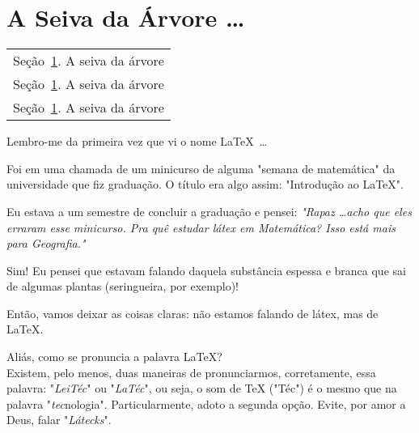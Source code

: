 \section{A Seiva da Árvore \ldots}\label{sec:seiva} %

\begin{margintable}\vspace{.8in}\footnotesize
  \begin{tabularx}{\marginparwidth}{|X}
    Seção~\ref{sec:seiva}. A seiva da árvore\\
    Seção~\ref{sec:seiva}. A seiva da árvore\\
    Seção~\ref{sec:seiva}. A seiva da árvore\\
  \end{tabularx}
\end{margintable}

Lembro-me da primeira vez que vi o nome \LaTeX\ \ldots

Foi em uma chamada de um minicurso de alguma "semana de matemática" da 
universidade que fiz graduação.
O título era algo assim: "Introdução ao \LaTeX".

Eu estava a um semestre de concluir a graduação e pensei: 
\textit{
  "Rapaz \ldots acho que eles erraram esse minicurso. 
  Pra quê estudar látex em Matemática? 
  Isso está mais para Geografia."
}


Sim! 
Eu pensei que estavam falando daquela substância espessa e branca que sai de 
algumas plantas (seringueira, por exemplo)!

Então, vamos deixar as coisas claras: não estamos falando de látex, mas de \LaTeX.

\begin{aviso}
  Aliás, como se pronuncia a palavra \LaTeX?\\
  Existem, pelo menos, duas maneiras de pronunciarmos, corretamente, essa palavra:
  "\textit{LeiTéc}" ou "\textit{LaTéc}", ou seja, o som de \TeX{} ("Téc") é o 
  mesmo que na palavra "\textit{tec}nologia". 
  Particularmente, adoto a segunda opção.
  Evite, por amor a Deus, falar "\textit{Látecks}".
\end{aviso}

